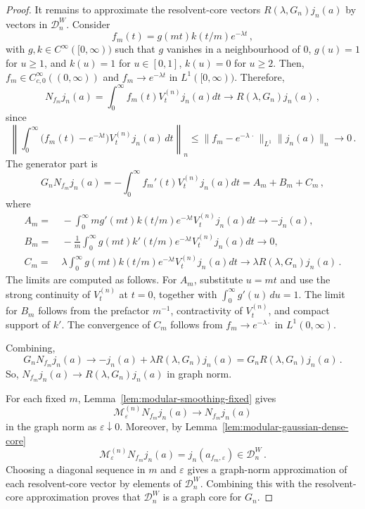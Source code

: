 \documentclass[11pt,a4paper]{article}
\theoremstyle{plain}
\numberwithin{theorem}{section}
\theoremstyle{definition}
\newcommand{\?}{\overset{?}{=}}
\newcommand{\I}{\infty}
\renewcommand{\l}{\lambda}	%
\newcommand{\cD}{\mathcal{D}}
\begin{document}
\begin{proof}
It remains to approximate the resolvent-core vectors $R(\l,G_n)j_n(a)$ by vectors in $\cD_n^{W}$.  
Consider
\begin{equation*}
    f_m(t) = g(mt)k(t/m)e^{-\l t}\,,
\end{equation*}
with $g,k\in C^\I([0,\I))$ such that $g$ vanishes in a neighbourhood of $0$, $ g(u)=1$ for $u\geq1$, and $k(u)=1$ for $u\in[0,1]$, $k(u)=0$ for $u\geq2$. Then, $f_m\in C_{c,0}^\infty((0,\infty))$ and $f_m\to e^{-\lambda t}$ in $L^1([0,\infty))$. 
Therefore,
\begin{equation*}
  N_{f_m}j_n(a) = \int_0^\I f_m(t)V_t^{(n)}j_n(a)dt \longrightarrow R(\l,G_n)j_n(a)\,,
\end{equation*}
since
\begin{equation*}
  \left\|\int_0^\infty \bigl(f_m(t)-e^{-\lambda t}\bigr)V_t^{(n)}j_n(a)\,dt\right\|_n
  \leq \|f_m-e^{-\lambda\, \cdot\,}\|_{L^1}\|j_n(a)\|_n \to 0\,.
\end{equation*}
The generator part is
\begin{equation*}
    G_nN_{f_m}j_n(a) = - \int_0^\I f_m'(t)V_t^{(n)}j_n(a)dt = A_m+B_m+C_m\,,
\end{equation*}
where
\begin{align*}
    A_m =&\ -\int_0^\I mg'(mt)k(t/m)e^{-\l t}V_t^{(n)}j_n(a)dt\longrightarrow -j_n(a), \\
    B_m =&\ -\frac1m\int_0^\I g(mt)k'(t/m)e^{-\l t}V_t^{(n)}j_n(a)dt \longrightarrow0, \\
    C_m =&\ \l\int_0^\I g(mt)k(t/m)e^{-\l t}V_t^{(n)}j_n(a)dt \longrightarrow \l R(\l,G_n)j_n(a)\,.
\end{align*}
The limits are computed as follows. For \(A_m\), substitute \(u=mt\) and use the strong continuity of
\(V_t^{(n)}\) at \(t=0\), together with
\(\int_0^\infty g'(u)\,du=1\). The limit for \(B_m\) follows
from the prefactor \(m^{-1}\), contractivity of \(V_t^{(n)}\), and
compact support of \(k'\). The convergence of \(C_m\) follows from
\(f_m\to e^{-\lambda\cdot}\) in \(L^1(0,\infty)\).

Combining,
\begin{equation*}
    G_nN_{f_m}j_n(a) \longrightarrow -j_n(a) + \l R(\l,G_n)j_n(a) = G_n R(\l,G_n)j_n(a)\,.
\end{equation*}
So, $N_{f_m}j_n(a)\to R(\l,G_n)j_n(a)$ in graph norm.

For each fixed $m$, Lemma~\ref{lem:modular-smoothing-fixed} gives
\begin{equation*}
  \mathcal M_\varepsilon^{(n)}N_{f_m}j_n(a)\longrightarrow N_{f_m}j_n(a)
\end{equation*}
 in the graph norm as $\varepsilon\downarrow 0$.  
 Moreover, by Lemma~\ref{lem:modular-gaussian-dense-core}
\begin{equation*}
  \mathcal M_\varepsilon^{(n)}N_{f_m}j_n(a)
  =j_n(a_{f_m,\varepsilon})\in\cD_n^{W}\,.
\end{equation*}
Choosing a diagonal sequence in $m$ and $\varepsilon$ gives a graph-norm approximation of each resolvent-core vector by elements of $\cD_n^{W}$.  Combining this with the resolvent-core approximation proves that $\cD_n^{W}$ is a graph core for $G_n$.
\end{proof}
\end{document}
